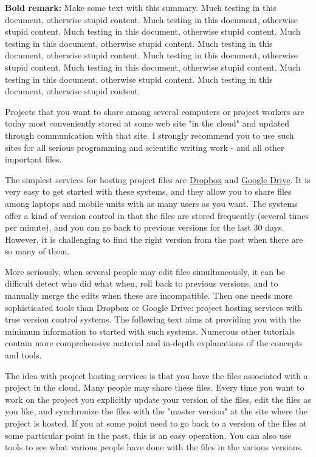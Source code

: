 \documentclass[%
oneside,                 %
final,                   %
10pt]{article}
\newenvironment{summary_mdfboxadmon}[1][]{
\begin{summary_mdfboxmdframed}[frametitle=#1]
}
{
\end{summary_mdfboxmdframed}
}
\theoremstyle{definition}
\begin{document}
\begin{enumerate}
\begin{summary_mdfboxadmon}[Summary.]
\textbf{Bold remark:} Make some text with this summary.
Much testing in this document, otherwise stupid content.
Much testing in this document, otherwise stupid content.
Much testing in this document, otherwise stupid content.
Much testing in this document, otherwise stupid content.
Much testing in this document, otherwise stupid content.
Much testing in this document, otherwise stupid content.
Much testing in this document, otherwise stupid content.
Much testing in this document, otherwise stupid content.
Much testing in this document, otherwise stupid content.
\end{summary_mdfboxadmon} %



Projects that you want to share among several computers or project
workers are today most conveniently stored at some web site "in the
cloud" and updated through communication with that site. I strongly
recommend you to use such sites for all serious programming and
scientific writing work - and all other important files.

The simplest services for hosting project files are \href{{https://dropbox.com}}{Dropbox} and \href{{https://drive.google.com}}{Google Drive}.
It is very easy to get started with these systems, and they allow you
to share files among laptops and mobile units with as many users as
you want. The systems offer a kind of version control in that the
files are stored frequently (several times per minute), and you can go
back to previous versions for the last 30 days. However, it is
challenging  to find the right version from the past when there are
so many of them.

More seriously, when several people may edit files simultaneously, it
can be difficult detect who did what when, roll back to previous
versions, and to manually merge the edits when these are
incompatible. Then one needs more sophisticated tools than Dropbox or
Google Drive: project hosting services with true version control
systems.  The following text aims at providing you with the minimum
information to started with such systems. Numerous other tutorials
contain more comprehensive material and in-depth explanations of the
concepts and tools.

The idea with project hosting services is that you have the files
associated with a project in the cloud. Many people may share these
files.  Every time you want to work on the project you explicitly
update your version of the files, edit the files as you like, and
synchronize the files with the "master version" at the site where the
project is hosted.  If you at some point need to go back to a
version of the files at some particular point in the past,
this is an easy operation. You can also use tools to see
what various people have done with the files in the various versions.


\end{enumerate}
\end{document}
